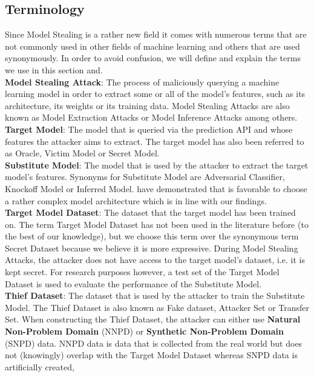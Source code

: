 \subsection{Terminology}
\label{sec:ModelStealing:Terminology}
Since Model Stealing is a rather new field it comes with numerous terms that are not commonly used in other fields of machine learning and others that are used 
synonymously. In order to avoid confusion, we will define and explain the terms we use in this section and. \\
\textbf{Model Stealing Attack}: The process of maliciously querying a machine learning model in order to extract some or all of the model's features, such as its
architecture, its weights or its training data. Model Stealing Attacks are also known as Model Extraction Attacks or Model Inference Attacks among others. \\
\textbf{Target Model}: The model that is queried via the prediction API and whose features the attacker aims to extract. The target model has also been referred to 
as Oracle, Victim Model or Secret Model. \\
\textbf{Substitute Model}: The model that is used by the attacker to extract the target model's features. Synonyms for Substitute Model are Adversarial Classifier,
Knockoff Model or Inferred Model. \cite{orekondy2019knockoff} have demonstrated that is favorable to choose a rather complex model architecture which is in line with 
our findings.\\
\textbf{Target Model Dataset}: The dataset that the target model has been trained on. The term Target Model Dataset has not been used in the literature before (to 
the best of our knowledge), but we choose this term over the synonymous term Secret Dataset because we believe it is more expressive. During Model Stealing Attacks,
the attacker does not have access to the target model's dataset, i.e. it is kept secret. For research purposes however, a test set of the Target Model Dataset is
used to evaluate the performance of the Substitute Model. \\
\textbf{Thief Dataset}: The dataset that is used by the attacker to train the Substitute Model. The Thief Dataset is also known as Fake dataset, Attacker Set or 
Transfer Set. When constructing the Thief Dataset, the attacker can either use \textbf{Natural Non-Problem Domain} (NNPD) or \textbf{Synthetic Non-Problem Domain} (SNPD)
data. NNPD data is data that is collected from the real world but does not (knowingly) overlap with the Target Model Dataset whereas SNPD data is artificially created,
